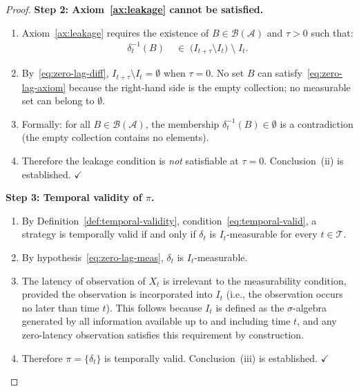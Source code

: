 \documentclass[12pt,openany]{book}
\newcommand{\calI}{\mathcal{I}}
\newcommand{\calA}{\mathcal{A}}
\numberwithin{equation}{chapter}
\theoremstyle{plain}
\theoremstyle{definition}
\theoremstyle{remark}
\numberwithin{equation}{chapter}
\theoremstyle{plain}
\def\calI{I}%
\begin{document}
\begin{proof}
\medskip
\noindent\textbf{Step 2: Axiom~\ref{ax:leakage} cannot be satisfied.}
\begin{enumerate}
  \item Axiom~\ref{ax:leakage} requires the existence of
        $B \in \mathcal{B}(\calA)$ and $\tau > 0$ such that:
        \begin{align}
          \delta_t^{-1}(B)
          &\;\in\;
          \bigl(\calI_{t+\tau} \setminus \calI_t\bigr)
          \;\setminus\; \calI_t.
          \label{eq:zero-lag-axiom}
        \end{align}
  \item By~\eqref{eq:zero-lag-diff}, $\calI_{t+\tau} \setminus
        \calI_t = \emptyset$ when $\tau = 0$.  No set $B$ can
        satisfy~\eqref{eq:zero-lag-axiom} because the right-hand
        side is the empty collection; no measurable set can belong
        to $\emptyset$.
  \item Formally: for all $B \in \mathcal{B}(\calA)$, the
        membership $\delta_t^{-1}(B) \in \emptyset$ is a
        contradiction (the empty collection contains no elements).
  \item Therefore the leakage condition is \emph{not} satisfiable
        at $\tau = 0$.  Conclusion~(ii) is established.
        $\checkmark$
\end{enumerate}

\medskip
\noindent\textbf{Step 3: Temporal validity of $\pi$.}
\begin{enumerate}
  \item By Definition~\ref{def:temporal-validity},
        condition~\eqref{eq:temporal-valid}, a strategy is
        temporally valid if and only if $\delta_t$ is
        $\calI_t$-measurable for every $t \in \mathcal{T}$.
  \item By hypothesis~\eqref{eq:zero-lag-meas}, $\delta_t$ is
        $\calI_t$-measurable.
  \item The latency of observation of $X_t$ is irrelevant to the
        measurability condition, provided the observation is
        incorporated into $\calI_t$ (i.e., the observation occurs
        no later than time $t$).  This follows because $\calI_t$
        is defined as the $\sigma$-algebra generated by all
        information available up to and including time $t$, and
        any zero-latency observation satisfies this requirement by
        construction.
  \item Therefore $\pi = \{\delta_t\}$ is temporally valid.
        Conclusion~(iii) is established. $\checkmark$
\end{enumerate}


\end{proof}
\end{document}

